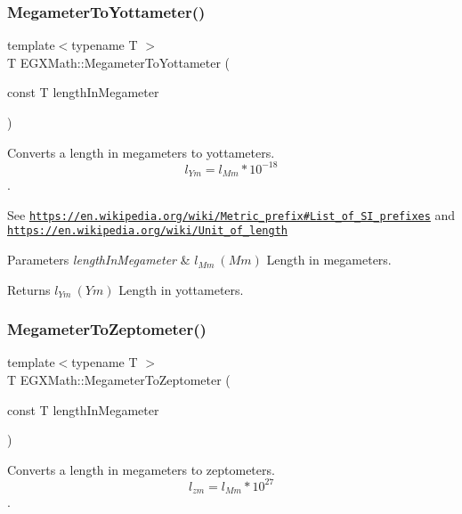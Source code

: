 \subsubsection{\texorpdfstring{Megameter\+To\+Yottameter()}{MegameterToYottameter()}}
{\footnotesize\ttfamily template$<$typename T $>$ \\
T E\+G\+X\+Math\+::\+Megameter\+To\+Yottameter (\begin{DoxyParamCaption}\item[{const T}]{length\+In\+Megameter }\end{DoxyParamCaption})}



Converts a length in megameters to yottameters. \[ l_{Ym}=l_{Mm} * 10^{-18} \]. 

See \href{https://en.wikipedia.org/wiki/Metric_prefix#List_of_SI_prefixes}{\tt https\+://en.\+wikipedia.\+org/wiki/\+Metric\+\_\+prefix\#\+List\+\_\+of\+\_\+\+S\+I\+\_\+prefixes} and \href{https://en.wikipedia.org/wiki/Unit_of_length}{\tt https\+://en.\+wikipedia.\+org/wiki/\+Unit\+\_\+of\+\_\+length} 
\begin{DoxyParams}{Parameters}
{\em length\+In\+Megameter} & $ l_{Mm}\ (Mm)$ Length in megameters. \\
\hline
\end{DoxyParams}
\begin{DoxyReturn}{Returns}
$ l_{Ym}\ (Ym)$ Length in yottameters. 
\end{DoxyReturn}
\mbox{\label{group___e_g_x_math-_conversions-_length_conversions-_megameter-_s_i_ga38fee336ea865f1f7ec6541c2256a8fe}} 
\subsubsection{\texorpdfstring{Megameter\+To\+Zeptometer()}{MegameterToZeptometer()}}
{\footnotesize\ttfamily template$<$typename T $>$ \\
T E\+G\+X\+Math\+::\+Megameter\+To\+Zeptometer (\begin{DoxyParamCaption}\item[{const T}]{length\+In\+Megameter }\end{DoxyParamCaption})}



Converts a length in megameters to zeptometers. \[ l_{zm}=l_{Mm} * 10^{27} \]. 

